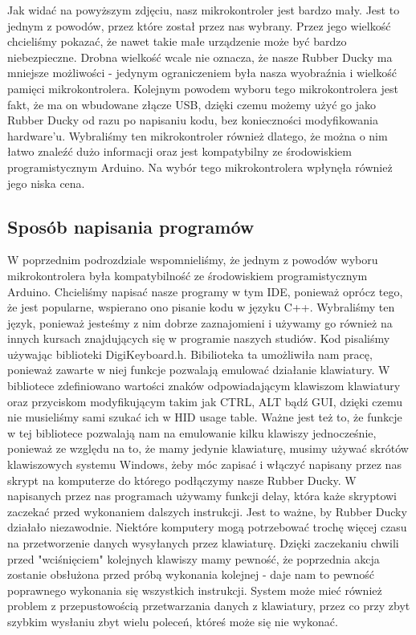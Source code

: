 \documentclass{article}
\begin{document}
Jak widać na powyższym zdjęciu, nasz mikrokontroler jest bardzo mały. Jest to jednym z powodów, przez które został przez nas wybrany. Przez jego wielkość chcieliśmy pokazać, że nawet takie małe urządzenie może być bardzo niebezpieczne. Drobna wielkość wcale nie oznacza, że nasze Rubber Ducky ma mniejsze możliwości - jedynym ograniczeniem była nasza wyobraźnia i wielkość pamięci mikrokontrolera. Kolejnym powodem wyboru tego mikrokontrolera jest fakt, że ma on wbudowane złącze USB, dzięki czemu możemy użyć go jako Rubber Ducky od razu po napisaniu kodu, bez konieczności modyfikowania hardware'u. Wybraliśmy ten mikrokontroler również dlatego, że można o nim łatwo znaleźć dużo informacji oraz jest kompatybilny ze środowiskiem programistycznym Arduino. Na wybór tego mikrokontrolera wpłynęła również jego niska cena.

\subsection{Sposób napisania programów}
W poprzednim podrozdziale wspomnieliśmy, że jednym z powodów wyboru mikrokontrolera była kompatybilność ze środowiskiem programistycznym Arduino. Chcieliśmy napisać nasze programy w tym IDE, ponieważ oprócz tego, że jest popularne, wspierano ono pisanie kodu w języku C++. Wybraliśmy ten język, ponieważ jesteśmy z nim dobrze zaznajomieni i używamy go również na innych kursach znajdujących się w programie naszych studiów.
Kod pisaliśmy używając biblioteki DigiKeyboard.h. Bibilioteka ta umożliwiła nam pracę, ponieważ zawarte w niej funkcje pozwalają emulować działanie klawiatury. W bibliotece zdefiniowano wartości znaków odpowiadającym klawiszom klawiatury oraz przyciskom modyfikującym takim jak CTRL, ALT bądź GUI, dzięki czemu nie musieliśmy sami szukać ich w HID usage table. Ważne jest też to, że funkcje w tej bibliotece pozwalają nam na emulowanie kilku klawiszy jednocześnie, ponieważ ze względu na to, że mamy jedynie klawiaturę, musimy używać skrótów klawiszowych systemu Windows, żeby móc zapisać i włączyć napisany przez nas skrypt na komputerze do którego podłączymy nasze Rubber Ducky.
W napisanych przez nas programach używamy funkcji delay, która każe skryptowi zaczekać przed wykonaniem dalszych instrukcji. Jest to ważne, by Rubber Ducky działało niezawodnie. Niektóre komputery mogą potrzebować trochę więcej czasu na przetworzenie danych wysyłanych przez klawiaturę. Dzięki zaczekaniu chwili przed "wciśnięciem" kolejnych klawiszy mamy pewność, że poprzednia akcja zostanie obsłużona przed próbą wykonania kolejnej - daje nam to pewność poprawnego wykonania się wszystkich instrukcji. System może mieć również problem z przepustowością przetwarzania danych z klawiatury, przez co przy zbyt szybkim wysłaniu zbyt wielu poleceń, któreś może się nie wykonać. 
\end{document}
